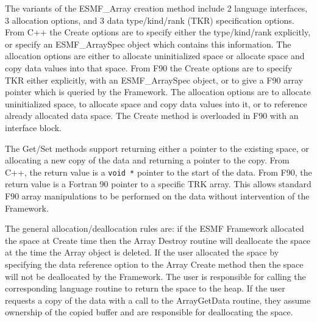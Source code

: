 

The variants of the ESMF\_Array creation method include 2 language interfaces, 
3 allocation options, and 3 data type/kind/rank (TKR) specification options.  
From C++ the Create options are to specify
either the type/kind/rank explicitly, or specify an ESMF\_ArraySpec
object which contains this information.  The allocation options 
are either to allocate uninitialized space or allocate space and
copy data values into that space.  
From F90 the Create options
are to specify TKR either explicitly, with an ESMF\_ArraySpec
object, or to give a F90 array pointer which is queried by the
Framework.  The allocation options are to allocate uninitialized
space, to allocate space and copy data values into it, or to
reference already allocated data space.
The Create method is overloaded in F90 with an interface block.

The Get/Set methods support returning either a pointer to
the existing space, or allocating a new copy of the data
and returning a pointer to the copy.  From C++, the return 
value is a {\tt void *} pointer to the start of the data.
From F90, the return value is a Fortran 90 pointer to a
specific TRK array.  This allows standard F90 array manipulations
to be performed on the data without intervention of the Framework.

The general allocation/deallocation rules are: if the ESMF Framework
allocated the space at Create time then the Array Destroy routine 
will deallocate the space at the time the Array object is deleted.  
If the user allocated the space by specifying the data 
reference option to the Array Create method then  
the space will not
be deallocated by the Framework. The user is responsible
for calling the corresponding language routine to return the
space to the heap.  If the user requests a copy of the data with
a call to the ArrayGetData routine, they assume ownership of
the copied buffer and are responsible for deallocating the space.


